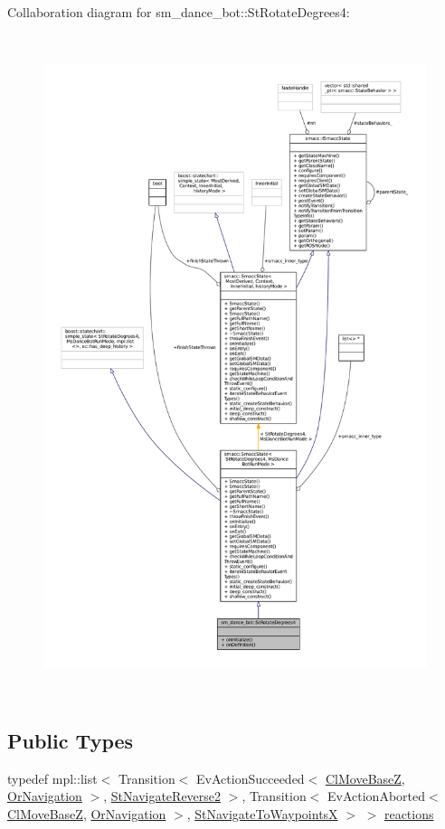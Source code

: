 Collaboration diagram for sm\+\_\+dance\+\_\+bot\+:\+:St\+Rotate\+Degrees4\+:
\nopagebreak
\begin{figure}[H]
\begin{center}
\leavevmode
\includegraphics[height=550pt]{structsm__dance__bot_1_1StRotateDegrees4__coll__graph}
\end{center}
\end{figure}
\subsection*{Public Types}
\begin{DoxyCompactItemize}
\item 
typedef mpl\+::list$<$ Transition$<$ Ev\+Action\+Succeeded$<$ \hyperlink{classmove__base__z__client_1_1ClMoveBaseZ}{Cl\+Move\+BaseZ}, \hyperlink{classsm__dance__bot_1_1OrNavigation}{Or\+Navigation} $>$, \hyperlink{structsm__dance__bot_1_1StNavigateReverse2}{St\+Navigate\+Reverse2} $>$, Transition$<$ Ev\+Action\+Aborted$<$ \hyperlink{classmove__base__z__client_1_1ClMoveBaseZ}{Cl\+Move\+BaseZ}, \hyperlink{classsm__dance__bot_1_1OrNavigation}{Or\+Navigation} $>$, \hyperlink{structsm__dance__bot_1_1StNavigateToWaypointsX}{St\+Navigate\+To\+WaypointsX} $>$ $>$ \hyperlink{structsm__dance__bot_1_1StRotateDegrees4_a4850f13da169b79792836fa0319d0659}{reactions}
\end{DoxyCompactItemize}
